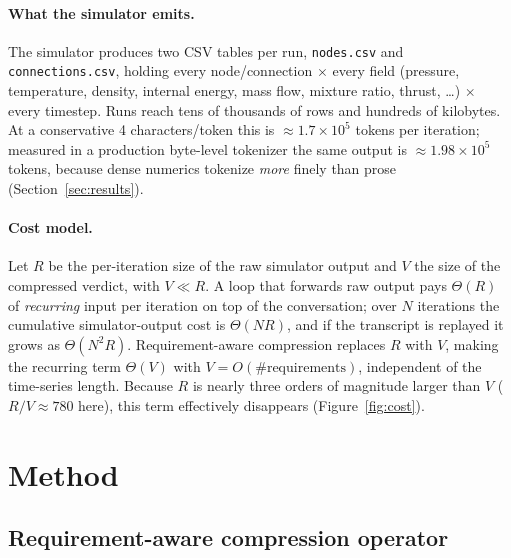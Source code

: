 \documentclass[10pt,twocolumn]{article}
\begin{document}
\paragraph{What the simulator emits.}
The simulator produces two CSV tables per run, \texttt{nodes.csv} and
\texttt{connections.csv}, holding every node/connection $\times$ every field
(pressure, temperature, density, internal energy, mass flow, mixture ratio,
thrust, \dots) $\times$ every timestep. Runs reach tens of thousands of rows and
hundreds of kilobytes. At a conservative 4 characters/token this is
$\approx\!1.7\times10^{5}$ tokens per iteration; measured in a production byte-level
tokenizer the same output is $\approx\!1.98\times10^{5}$ tokens, because dense
numerics tokenize \emph{more} finely than prose (Section~\ref{sec:results}).

\paragraph{Cost model.}
Let $R$ be the per-iteration size of the raw simulator output and $V$ the size of
the compressed verdict, with $V\ll R$. A loop that forwards raw output pays $\Theta(R)$
of \emph{recurring} input per iteration on top of the conversation; over $N$
iterations the cumulative simulator-output cost is $\Theta(NR)$, and if the
transcript is replayed it grows as $\Theta(N^2 R)$. Requirement-aware compression
replaces $R$ with $V$, making the recurring term $\Theta(V)$ with
$V=O(\text{\#requirements})$, independent of the time-series length. Because $R$ is
nearly three orders of magnitude larger than $V$ ($R/V\approx\!780$ here), this term
effectively disappears (Figure~\ref{fig:cost}).

\section{Method}
\label{sec:method}

\subsection{Requirement-aware compression operator}
\end{document}
